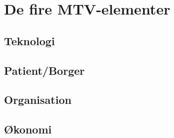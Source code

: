 \chapter{De fire MTV-elementer}
\section{Teknologi}
\section{Patient/Borger}
\section{Organisation}
\section{Økonomi}

